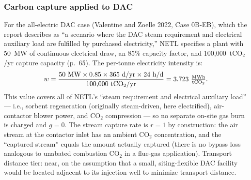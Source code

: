 \documentclass[11pt]{article}
\newcommand{\cotwo}{\ensuremath{\mathrm{CO_2}}}
\begin{document}
\subsubsection{Carbon capture applied to DAC}

For the all-electric DAC case (Valentine and Zoelle 2022, Case 0B-EB), which the report describes as ``a scenario where the DAC steam requirement and electrical auxiliary load are fulfilled by purchased electricity,'' NETL specifies a plant with 50~MW of continuous electrical draw, an 85\% capacity factor, and 100{,}000~t\cotwo{}/yr capture capacity (p.~65). The per-tonne electricity intensity is:
%
\[
  w = \frac{50~\text{MW} \times 0.85 \times 365~\text{d/yr} \times 24~\text{h/d}}{100{,}000~\text{t\cotwo{}/yr}} = 3.723~\tfrac{\text{MWh}}{\text{t\cotwo{}}}.
\]
%
This value covers all of NETL's ``steam requirement and electrical auxiliary load'' --- i.e., sorbent regeneration (originally steam-driven, here electrified), air-contactor blower power, and \cotwo{} compression --- so no separate on-site gas burn is charged and $g = 0$. The stream capture rate is $r = 1$ by construction: the air stream at the contactor inlet has an ambient \cotwo{} concentration, and the ``captured stream'' equals the amount actually captured (there is no bypass loss analogous to unabated combustion \cotwo{} in a flue-gas application). Transport distance tier: near, on the assumption that a small, siting-flexible DAC facility would be located adjacent to its injection well to minimize transport distance.
\end{document}

